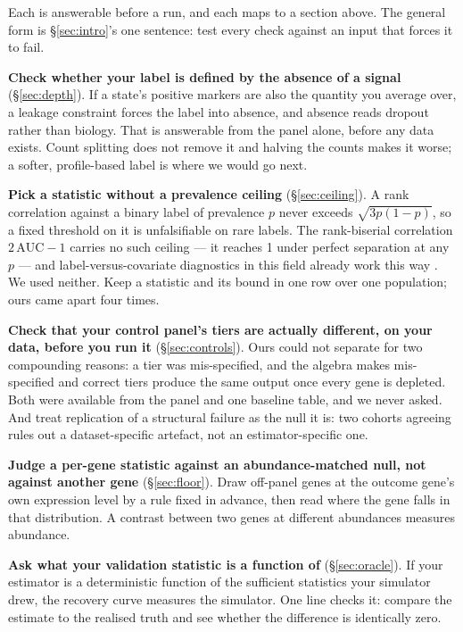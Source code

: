 \documentclass{article}
\begin{document}
Each is answerable before a run, and each maps to a section above. The general
form is \S\ref{sec:intro}'s one sentence: test every check against an input that
forces it to fail.

\textbf{Check whether your label is defined by the absence of a signal}
(\S\ref{sec:depth}). If a state's positive markers are also the quantity you
average over, a leakage constraint forces the label into absence, and absence
reads dropout rather than biology. That is answerable from the panel alone,
before any data exists. Count splitting does not remove it and halving the counts
makes it worse; a softer, profile-based label is where we would go next.

\textbf{Pick a statistic without a prevalence ceiling} (\S\ref{sec:ceiling}). A
rank correlation against a binary label of prevalence $p$ never exceeds
$\sqrt{3p(1-p)}$, so a fixed threshold on it is unfalsifiable on rare labels. The
rank-biserial correlation $2\,\mathrm{AUC} - 1$ carries no such ceiling --- it
reaches 1 under perfect separation at any $p$ --- and label-versus-covariate
diagnostics in this field already work this way
\citep{buttner2019,korsunsky2019,luecken2022}. We used neither. Keep a statistic
and its bound in one row over one population; ours came apart four times.

\textbf{Check that your control panel's tiers are actually different, on your
data, before you run it} (\S\ref{sec:controls}). Ours could not separate for two
compounding reasons: a tier was mis-specified, and the algebra makes
mis-specified and correct tiers produce the same output once every gene is
depleted. Both were available from the panel and one baseline table, and we never
asked. And treat replication of a structural failure as the null it is: two
cohorts agreeing rules out a dataset-specific artefact, not an
estimator-specific one.

\textbf{Judge a per-gene statistic against an abundance-matched null, not against
another gene} (\S\ref{sec:floor}). Draw off-panel genes at the outcome gene's own
expression level by a rule fixed in advance, then read where the gene falls in
that distribution. A contrast between two genes at different abundances measures
abundance.

\textbf{Ask what your validation statistic is a function of}
(\S\ref{sec:oracle}). If your estimator is a deterministic function of the
sufficient statistics your simulator drew, the recovery curve measures the
simulator. One line checks it: compare the estimate to the realised truth and see
whether the difference is identically zero.
\end{document}
